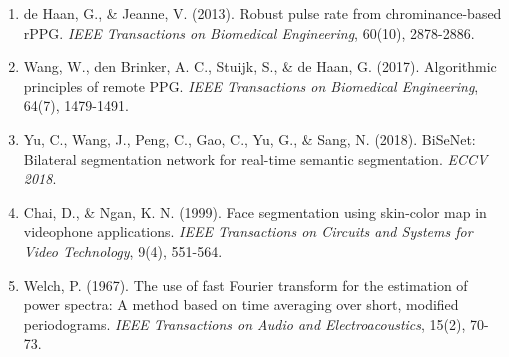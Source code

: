 \documentclass[11pt,a4paper]{article}
\begin{document}
\begin{enumerate}
    \item de Haan, G., \& Jeanne, V. (2013). Robust pulse rate from chrominance-based rPPG. \textit{IEEE Transactions on Biomedical Engineering}, 60(10), 2878-2886.
    
    \item Wang, W., den Brinker, A. C., Stuijk, S., \& de Haan, G. (2017). Algorithmic principles of remote PPG. \textit{IEEE Transactions on Biomedical Engineering}, 64(7), 1479-1491.
    
    \item Yu, C., Wang, J., Peng, C., Gao, C., Yu, G., \& Sang, N. (2018). BiSeNet: Bilateral segmentation network for real-time semantic segmentation. \textit{ECCV 2018}.
    
    \item Chai, D., \& Ngan, K. N. (1999). Face segmentation using skin-color map in videophone applications. \textit{IEEE Transactions on Circuits and Systems for Video Technology}, 9(4), 551-564.
    
    \item Welch, P. (1967). The use of fast Fourier transform for the estimation of power spectra: A method based on time averaging over short, modified periodograms. \textit{IEEE Transactions on Audio and Electroacoustics}, 15(2), 70-73.
\end{enumerate}
\end{document}
